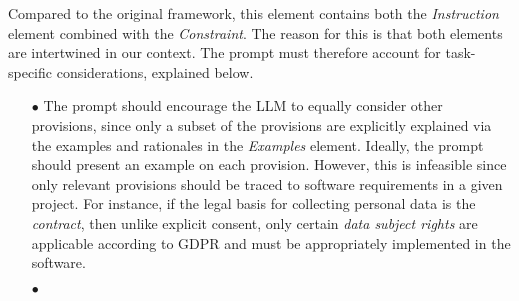 \begin{itemize}
    Compared to the original \RICE framework, this element contains both the \textit{Instruction} element combined with the \textit{Constraint}. The reason for this is that both elements are intertwined in our context. The  prompt must therefore account for task-specific considerations, explained below. %
    \begin{itemize}
        \item[$\bullet$] The prompt should encourage the LLM  to equally consider other provisions, since only a subset of the provisions are explicitly explained via the examples and rationales in the \textit{Examples} element. Ideally, the prompt should present an example on each provision. However, this is infeasible since only relevant provisions should be traced to software requirements in a given project. For instance, if the legal basis for collecting personal data is the \textit{contract}, then unlike explicit consent, only certain \textit{data subject rights} are applicable according to GDPR and must be appropriately implemented in the software.   %
        \item[$\bullet$]  %

\end{itemize}
\end{itemize}
